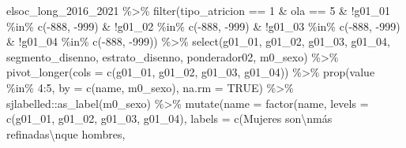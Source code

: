 \documentclass[
  12pt,
]{book}
\newenvironment{Shaded}{\begin{snugshade}}{\end{snugshade}}
\newcommand{\AttributeTok}[1]{\textcolor[rgb]{0.77,0.63,0.00}{#1}}
\newcommand{\ConstantTok}[1]{\textcolor[rgb]{0.00,0.00,0.00}{#1}}
\newcommand{\DecValTok}[1]{\textcolor[rgb]{0.00,0.00,0.81}{#1}}
\newcommand{\FunctionTok}[1]{\textcolor[rgb]{0.00,0.00,0.00}{#1}}
\newcommand{\NormalTok}[1]{#1}
\newcommand{\SpecialCharTok}[1]{\textcolor[rgb]{0.00,0.00,0.00}{#1}}
\newcommand{\StringTok}[1]{\textcolor[rgb]{0.31,0.60,0.02}{#1}}
\begin{document}
\begin{Shaded}
\begin{Highlighting}[]
\NormalTok{elsoc\_long\_2016\_2021 }\SpecialCharTok{\%\textgreater{}\%} 
  \FunctionTok{filter}\NormalTok{(tipo\_atricion }\SpecialCharTok{==} \DecValTok{1} \SpecialCharTok{\&}\NormalTok{ ola }\SpecialCharTok{==} \DecValTok{5} \SpecialCharTok{\&} \SpecialCharTok{!}\NormalTok{g01\_01 }\SpecialCharTok{\%in\%} \FunctionTok{c}\NormalTok{(}\SpecialCharTok{{-}}\DecValTok{888}\NormalTok{, }\SpecialCharTok{{-}}\DecValTok{999}\NormalTok{) }\SpecialCharTok{\&} \SpecialCharTok{!}\NormalTok{g01\_02 }\SpecialCharTok{\%in\%} \FunctionTok{c}\NormalTok{(}\SpecialCharTok{{-}}\DecValTok{888}\NormalTok{, }\SpecialCharTok{{-}}\DecValTok{999}\NormalTok{) }\SpecialCharTok{\&} \SpecialCharTok{!}\NormalTok{g01\_03 }\SpecialCharTok{\%in\%} \FunctionTok{c}\NormalTok{(}\SpecialCharTok{{-}}\DecValTok{888}\NormalTok{, }\SpecialCharTok{{-}}\DecValTok{999}\NormalTok{) }\SpecialCharTok{\&} \SpecialCharTok{!}\NormalTok{g01\_04 }\SpecialCharTok{\%in\%} \FunctionTok{c}\NormalTok{(}\SpecialCharTok{{-}}\DecValTok{888}\NormalTok{, }\SpecialCharTok{{-}}\DecValTok{999}\NormalTok{)) }\SpecialCharTok{\%\textgreater{}\%} 
  \FunctionTok{select}\NormalTok{(g01\_01, g01\_02, g01\_03, g01\_04, segmento\_disenno, estrato\_disenno, ponderador02, m0\_sexo) }\SpecialCharTok{\%\textgreater{}\%} 
  \FunctionTok{pivot\_longer}\NormalTok{(}\AttributeTok{cols =} \FunctionTok{c}\NormalTok{(g01\_01, g01\_02, g01\_03, g01\_04)) }\SpecialCharTok{\%\textgreater{}\%} 
  \FunctionTok{prop}\NormalTok{(value }\SpecialCharTok{\%in\%} \DecValTok{4}\SpecialCharTok{:}\DecValTok{5}\NormalTok{, }\AttributeTok{by =} \FunctionTok{c}\NormalTok{(name, m0\_sexo), }\AttributeTok{na.rm =} \ConstantTok{TRUE}\NormalTok{) }\SpecialCharTok{\%\textgreater{}\%} 
\NormalTok{  sjlabelled}\SpecialCharTok{::}\FunctionTok{as\_label}\NormalTok{(m0\_sexo) }\SpecialCharTok{\%\textgreater{}\%} 
  \FunctionTok{mutate}\NormalTok{(}\AttributeTok{name =} \FunctionTok{factor}\NormalTok{(name,}
                       \AttributeTok{levels =} \FunctionTok{c}\NormalTok{(}\StringTok{\textquotesingle{}g01\_01\textquotesingle{}}\NormalTok{, }\StringTok{\textquotesingle{}g01\_02\textquotesingle{}}\NormalTok{, }\StringTok{\textquotesingle{}g01\_03\textquotesingle{}}\NormalTok{, }\StringTok{\textquotesingle{}g01\_04\textquotesingle{}}\NormalTok{),}
                       \AttributeTok{labels =} \FunctionTok{c}\NormalTok{(}\StringTok{\textquotesingle{}Mujeres son}\SpecialCharTok{\textbackslash{}n}\StringTok{más refinadas}\SpecialCharTok{\textbackslash{}n}\StringTok{que hombres\textquotesingle{}}\NormalTok{,}

\end{Highlighting}
\end{Shaded}
\end{document}
